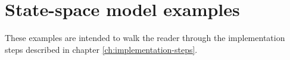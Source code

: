 \chapter{State-space model examples}

These examples are intended to walk the reader through the implementation steps
described in chapter \ref{ch:implementation-steps}.







